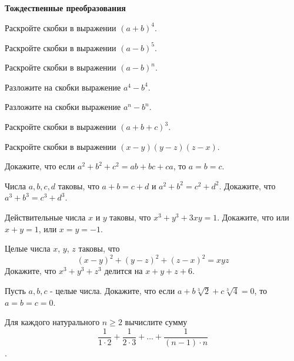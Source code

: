\documentclass{article}
\begin{document}
    \large

    \begin{center}
        \textbf{Тождественные преобразования}
    \end{center}

    \begin{enumerate_boxed}

        \item Раскройте скобки в выражении $(a + b)^4$.

        \item Раскройте скобки в выражении $(a - b)^5$.

        \item Раскройте скобки в выражении $(a - b)^n$.

        \item Разложите на скобки выражение $a^4- b^4$.

        \item Разложите на скобки выражение $a^n- b^n$.

        \item Раскройте скобки в выражении $(a + b + c)^3$.

        \item Раскройте скобки в выражении $(x-y)(y-z)(z-x)$.

        \item Докажите, что если $a^2 + b^2 + c^2 = ab + bc + ca$, то $a = b = c$.

        \item Числа $a, b, c, d$ таковы, что $a + b = c + d$ и $a^2 + b^2 = c^2 + d^2$.
        Докажите, что $a^3 + b^3 = c^3 + d^3$.

        \item Действительные числа $x$ и $y$ таковы, что $x^3 + y^3 + 3xy = 1$.
        Докажите, что или $x + y = 1$, или $x = y = -1$.

        \item Целые числа $x$, $y$, $z$ таковы, что \[(x-y)^2 + (y-z)^2 + (z-x)^2 = xyz\]
        Докажите, что $x^3 + y^3 + z^3$ делится на $x + y + z + 6$.

        \item Пусть $a, b, c$ - целые числа.
        Докажите, что если $a + b \sqrt[3]{2} + c \sqrt[3]{4} = 0$, то $a = b = c = 0$.

        \item Для каждого натурального $n \ge 2$ вычислите сумму
        \[\dfrac{1}{1 \cdot 2} + \dfrac{1}{2 \cdot 3} + \dotso +  \dfrac{1}{(n-1) \cdot n}\].


\end{enumerate_boxed}
\end{document}
